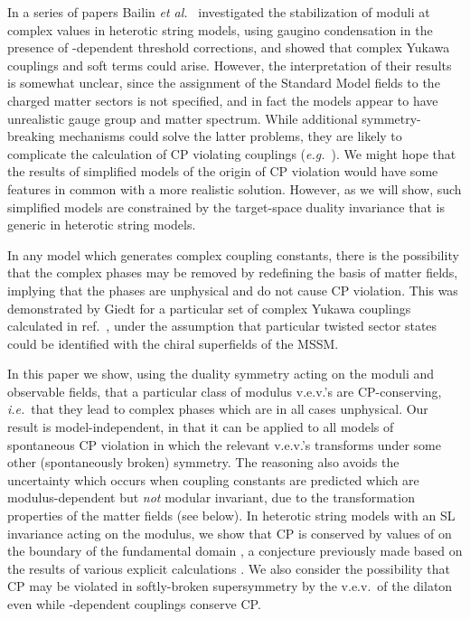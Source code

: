 \documentclass[a4paper,12pt]{article}
\begin{document}
In a series of papers Bailin {\em et al.\/}\ \cite{Bailin:1998iz+97,Bailin:1998xx} investigated the stabilization of moduli at complex values in heterotic string models, using gaugino condensation in the presence of \coordHE{}-dependent threshold corrections, and showed that complex Yukawa couplings and soft terms could arise. However, the interpretation of their results is somewhat unclear, since the assignment of the Standard Model fields to the charged matter sectors is not specified, and in fact the models appear to have unrealistic gauge group and matter spectrum. While additional symmetry-breaking mechanisms could solve the latter problems, they are likely to complicate the calculation of CP violating couplings ({\em e.g.\/}\ \cite{Bailin:1998yt}). We might hope that the results of simplified models of the origin of CP violation would have some features in common with a more realistic solution. However, as we will show, such simplified models are constrained by the target-space duality invariance that is generic in heterotic string models.

In any model which generates complex coupling constants, there is the possibility that the complex phases may be removed by redefining the basis of matter fields, implying that the phases are unphysical and do not cause CP violation. This was demonstrated by Giedt \cite{Giedt2000} for a particular set of complex Yukawa couplings calculated in ref.\ \cite{Bailin:1998xx}, under the assumption that particular twisted sector states could be identified with the chiral superfields of the MSSM. 

In this paper we show, using the duality symmetry acting on the moduli and observable fields, that a particular class of modulus v.e.v.'s are CP-conserving, {\em i.e.\/}\ that they lead to complex phases which are in all cases unphysical. Our result is model-independent, in that it can be applied to all models of spontaneous CP violation in which the relevant v.e.v.'s transforms under some other (spontaneously broken) symmetry. The reasoning also avoids the uncertainty which occurs when coupling constants are predicted which are modulus-dependent but {\em not}\/ modular invariant, due to the transformation properties of the matter fields (see below). In heterotic string models with an SL\coordHE{} invariance acting on the \coordHE{} modulus, we show that CP is conserved by values of \coordHE{} on the boundary of the fundamental domain \coordHE{}, a conjecture previously made \cite{BKL_unpub} based on the results of various explicit calculations \cite{Bailin:1998iz+97}. We also consider the possibility that CP may be violated in softly-broken supersymmetry by the v.e.v.\ of the dilaton even while \coordHE{}-dependent couplings conserve CP.
\end{document}
